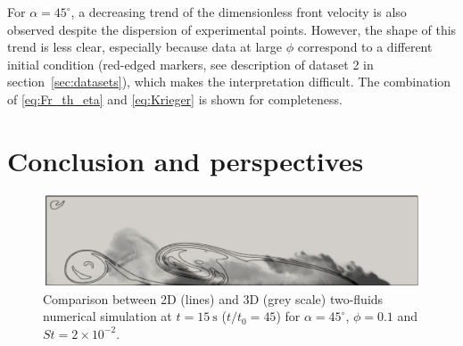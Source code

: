 \documentclass[12pt]{article}
\begin{document}
For $\alpha=45^\circ$, a decreasing trend of the dimensionless front velocity is also observed despite the dispersion of experimental points. However, the shape of this trend is less clear, especially because data at large $\phi$ correspond to a different initial condition (red-edged markers, see description of dataset 2 in section~\ref{sec:datasets}), which makes the interpretation difficult. The combination of \eqref{eq:Fr_th_eta} and \eqref{eq:Krieger} is shown for completeness.

\section{Conclusion and perspectives}
\label{sec:conclusion}

\begin{figure}[ht]
	\centering
	\includegraphics{figures/figure7.pdf}
	\caption{Comparison between 2D (lines) and 3D (grey scale) two-fluids numerical simulation at $t = 15~\textrm{s}$ ($t/t_{0} = 45$) for $\alpha = 45^\circ$, $\phi = 0.1$ and $St = 2{\times}10^{-2}$.}
	\label{fig:fig7}
\end{figure}
\end{document}
